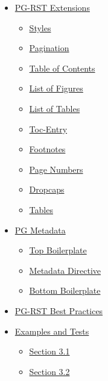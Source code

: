 \documentclass[a5paper]{book}
\begin{document}
\begin{german}
\begin{contents_env}
\begin{itemize}
\item[] \hyperlink{pg-rst-extensions}{PG-RST Extensions}
\begin{itemize}
\item[] \hyperlink{styles}{Styles}

\item[] \hyperlink{pagination}{Pagination}

\item[] \hyperlink{table-of-contents}{Table of Contents}

\item[] \hyperlink{list-of-figures}{List of Figures}

\item[] \hyperlink{list-of-tables}{List of Tables}

\item[] \hyperlink{toc-entry}{Toc-Entry}

\item[] \hyperlink{footnotes}{Footnotes}

\item[] \hyperlink{page-numbers}{Page Numbers}

\item[] \hyperlink{dropcaps}{Dropcaps}

\item[] \hyperlink{tables}{Tables}
\end{itemize}

\item[] \hyperlink{pg-metadata}{PG Metadata}
\begin{itemize}
\item[] \hyperlink{top-boilerplate}{Top Boilerplate}

\item[] \hyperlink{metadata-directive}{Metadata Directive}

\item[] \hyperlink{bottom-boilerplate}{Bottom Boilerplate}
\end{itemize}

\item[] \hyperlink{pg-rst-best-practices}{PG-RST Best Practices}

\item[] \hyperlink{tests-and-examples}{Examples and Tests}
\begin{itemize}
\item[] \hyperlink{section-3-1}{Section 3.1}

\item[] \hyperlink{section-3-2}{Section 3.2}


\end{itemize}
\end{itemize}
\end{contents_env}
\end{german}
\end{document}
